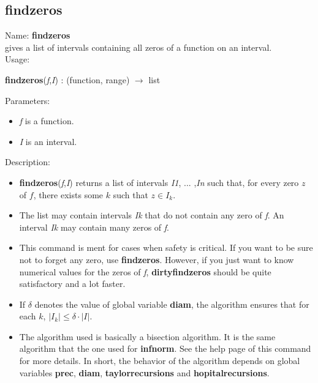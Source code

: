 \subsection{findzeros}
\label{labfindzeros}
\noindent Name: \textbf{findzeros}\\
gives a list of intervals containing all zeros of a function on an interval.\\

\noindent Usage: 
\begin{center}
\textbf{findzeros}(\emph{f},\emph{I}) : (\textsf{function}, \textsf{range}) $\rightarrow$ \textsf{list}\\
\end{center}
Parameters: 
\begin{itemize}
\item \emph{f} is a function.
\item \emph{I} is an interval.
\end{itemize}
\noindent Description: \begin{itemize}

\item \textbf{findzeros}(\emph{f},\emph{I}) returns a list of intervals \emph{I1}, ... ,\emph{In} such that, for 
   every zero $z$ of $f$, there exists some $k$ such that $z \in I_k$.

\item The list may contain intervals \emph{Ik} that do not contain any zero of \emph{f}.
   An interval \emph{Ik} may contain many zeros of \emph{f}.

\item This command is ment for cases when safety is critical. If you want to be sure
   not to forget any zero, use \textbf{findzeros}. However, if you just want to know 
   numerical values for the zeros of \emph{f}, \textbf{dirtyfindzeros} should be quite 
   satisfactory and a lot faster.

\item If $\delta$ denotes the value of global variable \textbf{diam}, the algorithm ensures
   that for each $k$, $|I_k| \le \delta \cdot |I|$.

\item The algorithm used is basically a bisection algorithm. It is the same algorithm
   that the one used for \textbf{infnorm}. See the help page of this command for more 
   details. In short, the behavior of the algorithm depends on global variables
   \textbf{prec}, \textbf{diam}, \textbf{taylorrecursions} and \textbf{hopitalrecursions}.
\end{itemize}
